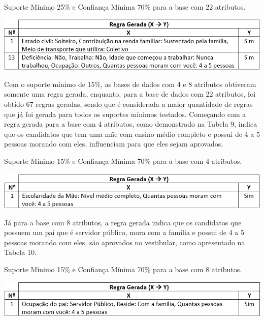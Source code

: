 \par
\begin{table}[!htp]
	\begin{center}
    \caption{\label{fig:waveform_fig} Suporte Mínimo 25\% e Confiança Mínima 70\% para a base com 22 atributos.}
	\includegraphics[scale=0.75]{Figuras/Suporte_25_atributos_22.png}
	\end{center}
\end{table}

\par
Com o suporte mínimo de 15\%, as bases de dados com 4 e 8 atributos obtiveram somente uma regra gerada, enquanto, para a base de dados com 22 atributos, foi obtido 67 regras geradas, sendo que é considerada a maior quantidade de regras que já foi gerada para todos os suportes mínimos testados. Começando com a regra gerada para a base com 4 atributos, como demonstrado na Tabela 9, indica que os candidatos que tem uma mãe com ensino médio completo e possui de 4 a 5 pessoas morando com eles, influenciam para que eles sejam aprovados.

\par
\begin{table}[!htp]
	\begin{center}
    \caption{\label{fig:waveform_fig} Suporte Mínimo 15\% e Confiança Mínima 70\% para a base com 4 atributos.}
	\includegraphics[scale=0.75]{Figuras/Suporte_15_atributos_4.png}
	\end{center}
\end{table}

\par
Já para a base com 8 atributos, a regra gerada indica que os candidatos que possuem um pai que é servidor público, mora com a família e possui de 4 a 5 pessoas morando com eles, são aprovados no vestibular, como apresentado na Tabela 10.

\par
\begin{table}[!htp]
	\begin{center}
    \caption{\label{fig:waveform_fig} Suporte Mínimo 15\% e Confiança Mínima 70\% para a base com 8 atributos.}
	\includegraphics[scale=0.75]{Figuras/Suporte_15_atributos_9.png}
	\end{center}
\end{table}

